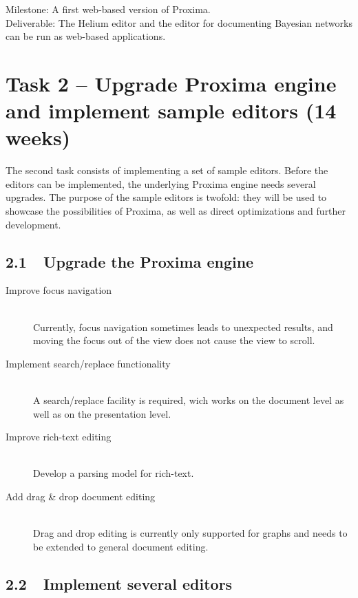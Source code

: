 \documentclass[10pt]{article}
\begin{document}
{\sc Milestone:} A first web-based version of Proxima.\\
{\sc Deliverable:} The Helium editor and the editor for documenting Bayesian networks can be run as web-based applications.

\section*{Task 2 -- Upgrade Proxima engine and implement sample editors (14 weeks)}

The second task consists of implementing a set of sample editors. Before the editors can be implemented, the underlying Proxima engine needs several upgrades. The purpose of the sample editors is twofold: they will be used to showcase the possibilities of Proxima, as well as direct optimizations and further development.

\subsection*{2.1~~Upgrade the Proxima engine}

\begin{description}

\item[Improve focus navigation] ~\\
Currently, focus navigation sometimes leads to unexpected results, and moving the focus out of the view does not cause the view to scroll.

\item[Implement search/replace functionality] ~\\
A search/replace facility is required, wich works on the document level as well as on the presentation level.

\item[Improve rich-text editing] ~\\
Develop a parsing model for rich-text.

\item[Add drag \& drop document editing]~\\
Drag and drop editing is currently only supported for graphs and needs to be extended to general document editing.

\end{description}

\subsection*{2.2~~Implement several editors}
\end{document}
